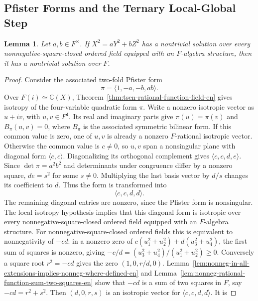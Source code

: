\documentclass[uplatex,dvipdfmx]{jsarticle}
\theoremstyle{matrixsosdefinition}
\newtheorem{lemma}[theorem]{Lemma}
\begin{document}
\subsection{Pfister Forms and the Ternary Local-Global Step}

\begin{lemma}\label{lem:ternary-local-global-en}
  Let \(a,b\in F^\times\). If \(X^2=aY^2+bZ^2\) has a nontrivial solution over
  every nonnegative-square-closed ordered field equipped with an \(F\)-algebra
  structure, then it has a nontrivial solution over \(F\).
\end{lemma}

\begin{proof}
  Consider the associated two-fold Pfister form
  \[
    \pi=\langle 1,-a,-b,ab\rangle.
  \]
  Over \(F(i)\simeq\mathbb{C}(X)\),
  Theorem~\ref{thm:tsen-rational-function-field-en} gives isotropy of the
  four-variable quadratic form \(\pi\).  Write a nonzero isotropic vector as \(u+iv\), with \(u,v\in F^4\).
  Its real and imaginary parts give
  \(\pi(u)=\pi(v)\) and \(B_\pi(u,v)=0\), where \(B_\pi\) is the associated
  symmetric bilinear form.  If this common value is zero, one of \(u,v\)
  is already a nonzero \(F\)-rational isotropic vector.
  Otherwise the common value is \(c\ne0\), so \(u,v\) span a nonsingular
  plane with diagonal form \(\langle c,c\rangle\).  Diagonalizing its
  orthogonal complement gives \(\langle c,c,d,e\rangle\).
  Since \(\det\pi=a^2b^2\) and determinants under congruence differ by a
  nonzero square, \(de=s^2\) for some \(s\ne0\).  Multiplying the last
  basis vector by \(d/s\) changes its coefficient to \(d\).
  Thus the form is transformed into
  \[
    \langle c,c,d,d\rangle.
  \]
  The remaining diagonal entries are nonzero, since the Pfister form is
  nonsingular.
  The local isotropy hypothesis implies that this diagonal form is isotropic
  over every nonnegative-square-closed ordered field equipped with an
  \(F\)-algebra structure. For nonnegative-square-closed ordered fields this is
  equivalent to nonnegativity of \(-cd\): in a nonzero zero of
  \(c(u_1^2+u_2^2)+d(u_3^2+u_4^2)\), the first sum of squares is nonzero,
  giving \(-c/d=(u_3^2+u_4^2)/(u_1^2+u_2^2)\ge0\).
  Conversely a square root \(r^2=-cd\) gives the zero \((1,0,r/d,0)\).
  Lemma~\ref{lem:nonneg-in-all-extensions-implies-nonneg-where-defined-en}
  and Lemma~\ref{lem:nonneg-rational-function-sum-two-squares-en} show that
  \(-cd\) is a sum of two squares in \(F\), say \(-cd=r^2+s^2\). Then
  \((d,0,r,s)\) is an isotropic vector for \(\langle c,c,d,d\rangle\). It is

\end{proof}
\end{document}
